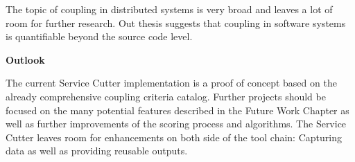 The topic of coupling in distributed systems is very broad and leaves a lot of room for further research. Out thesis suggests that coupling in software systems is quantifiable beyond the source code level.

\textbf{Outlook}

The current Service Cutter implementation is a proof of concept based on the already comprehensive coupling criteria catalog. Further projects should be focused on the many potential features described in the Future Work Chapter as well as further improvements of the scoring process and algorithms. The Service Cutter leaves room for enhancements on both side of the tool chain: Capturing data as well as providing reusable outputs.
